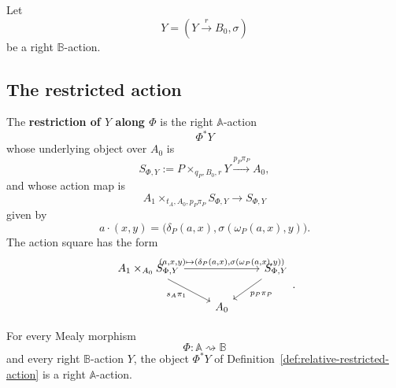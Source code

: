 Let
\[
Y=(Y\xrightarrow{r}B_0,\sigma)
\]
be a right \(\mathbb B\)-action.

\subsection{The restricted action}
\label{subsec:relative-restricted-action}

\begin{definition}
\label{def:relative-restricted-action}
The \textbf{restriction of \(Y\) along \(\Phi\)} is the right
\(\mathbb A\)-action
\[
\Phi^\ast Y
\]
whose underlying object over \(A_0\) is
\[
S_{\Phi,Y}:=
P\times_{q_P,B_0,r}Y
\xrightarrow{p_P\pi_P}
A_0,
\]
and whose action map is
\[
A_1\times_{t_A,A_0,p_P\pi_P}S_{\Phi,Y}
\to S_{\Phi,Y}
\]
given by
\[
a\cdot(x,y)
=
\bigl(
\delta_P(a,x),
\sigma(\omega_P(a,x),y)
\bigr).
\]
The action square has the form
\[
\begin{tikzcd}
A_1\times_{A_0}S_{\Phi,Y}
\arrow[rr,"{(a,x,y)\mapsto(\delta_P(a,x),\sigma(\omega_P(a,x),y))}"]
\arrow[dr,"s_A\pi_1"']
&&
S_{\Phi,Y}
\arrow[dl,"p_P\pi_P"]
\\
& A_0 &
\end{tikzcd}
.
\]
\end{definition}

\begin{theorem}
\label{thm:relative-mealy-restriction-actions}
For every Mealy morphism
\[
\Phi:\mathbb A\rightsquigarrow\mathbb B
\]
and every right \(\mathbb B\)-action \(Y\), the object
\(\Phi^\ast Y\) of Definition~\ref{def:relative-restricted-action} is a right
\(\mathbb A\)-action.
\end{theorem}

